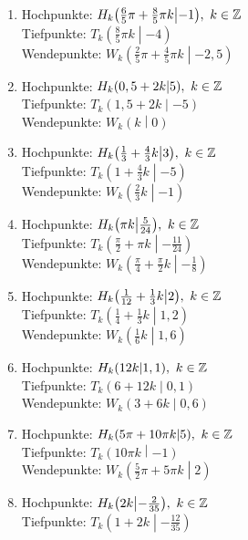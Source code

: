\begin{Answer}[ref=sincosExtremWendeA1]
\begin{enumerate}[label=\alph*)]
		\item Hochpunkte: \(H_k\left(\frac{6}{5}\pi+\frac{8}{5}\pi k \middle\vert-1 \right),\ k\in\Z\)\\
		Tiefpunkte: \(T_k\left(\frac{8}{5}\pi k \middle\vert-4 \right)\)\\
		Wendepunkte: \(W_k\left(\frac{2}{5}\pi+\frac{4}{5}\pi k \middle\vert-2,5 \right)\)
		\item Hochpunkte: \(H_k\left(0,5+2k \middle\vert5 \right),\ k\in\Z\)\\
		Tiefpunkte: \(T_k\left(1,5+2k \middle\vert-5 \right)\)\\
		Wendepunkte: \(W_k\left(k \middle\vert0 \right)\)
		\item Hochpunkte: \(H_k\left(\frac{1}{3}+\frac{4}{3}k \middle\vert 3\right),\ k\in\Z\)\\
		Tiefpunkte: \(T_k\left(1+\frac{4}{3}k \middle\vert -5\right)\)\\
		Wendepunkte: \(W_k\left(\frac{2}{3}k \middle\vert -1\right)\)
		\item Hochpunkte: \(H_k\left(\pi k \middle\vert\frac{5}{24} \right),\ k\in\Z\)\\
		Tiefpunkte: \(T_k\left(\frac{\pi}{2}+\pi k \middle\vert-\frac{11}{24} \right)\)\\
		Wendepunkte: \(W_k\left(\frac{\pi}{4}+\frac{\pi}{2}k \middle\vert-\frac{1}{8} \right)\)
		\item Hochpunkte: \(H_k\left(\frac{1}{12}+\frac{1}{3}k \middle\vert2 \right),\ k\in\Z\)\\
		Tiefpunkte: \(T_k\left(\frac{1}{4}+\frac{1}{3}k \middle\vert1,2 \right)\)\\
		Wendepunkte: \(W_k\left(\frac{1}{6}k \middle\vert1,6 \right)\)
		\item Hochpunkte: \(H_k\left(12k \middle\vert1,1 \right),\ k\in\Z\)\\
		Tiefpunkte: \(T_k\left(6+12k \middle\vert0,1 \right)\)\\
		Wendepunkte: \(W_k\left(3+6k \middle\vert0,6 \right)\)
		\item Hochpunkte: \(H_k\left(5\pi+10\pi k \middle\vert5 \right),\ k\in\Z\)\\
		Tiefpunkte: \(T_k\left(10\pi k \middle\vert-1 \right)\)\\
		Wendepunkte: \(W_k\left(\frac{5}{2}\pi+5\pi k \middle\vert2 \right)\)
		\item Hochpunkte: \(H_k\left(2k \middle\vert-\frac{2}{35} \right),\ k\in\Z\)\\
		Tiefpunkte: \(T_k\left(1+2k \middle\vert-\frac{12}{35} \right)\)\\

\end{enumerate}
\end{Answer}
